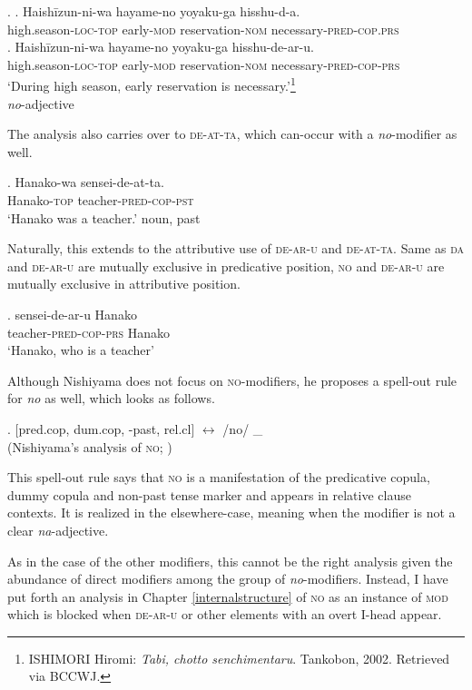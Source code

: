 \documentclass [output=book,colorlinks,citecolor=brown]{langscibook}
\begin{document}
\ex. \label{noadjective} \ag. Haishīzun-ni-wa hayame-no yoyaku-ga hisshu-d-a.\\
high.season-\textsc{loc-top} early-\textsc{mod} reservation-\textsc{nom} necessary-\textsc{pred-cop.prs}\\
\bg. Haishīzun-ni-wa hayame-no yoyaku-ga hisshu-de-ar-u.\\
high.season-\textsc{loc-top} early-\textsc{mod} reservation-\textsc{nom} necessary-\textsc{pred-cop-prs}\\
`During high season, early reservation is necessary.’\footnote{ISHIMORI Hiromi: \textit{Tabi, chotto senchimentaru}. Tankobon, 2002. Retrieved via BCCWJ.} \\ \null \hfill \textit{no}-adjective

The analysis also carries over to \textsc{de-at-ta}, which can-occur with a \textit{no}-modifier as well.

\exg. Hanako-wa sensei-de-at-ta.\\
Hanako-\textsc{top} teacher-\textsc{pred-cop-pst}\\
`Hanako was a teacher.' \null \hfill noun, past

Naturally, this extends to the attributive use of \textsc{de-ar-u} and \textsc{de-at-ta}. Same as \textsc{da} and \textsc{de-ar-u} are mutually exclusive in predicative position, \textsc{no} and \textsc{de-ar-u} are mutually exclusive in attributive position.


\exg. sensei-de-ar-u Hanako\\
teacher-\textsc{pred-cop-prs} Hanako\\
`Hanako, who is a teacher'

Although Nishiyama does not focus on \textsc{no}-modifiers, he proposes a spell-out rule for \textit{no} as well, which looks as follows.

\ex. [pred.cop, dum.cop, -past, rel.cl] $\leftrightarrow$ /no/ \_ \\ \null \hfill (Nishiyama’s analysis of \textsc{no}; \citealt[197]{nishiyama:1999:adj})

This spell-out rule says that \textsc{no} is a manifestation of the predicative copula, dummy copula and non-past tense marker and appears in relative clause contexts. It is realized in the elsewhere-case, meaning when the modifier is not a clear \textit{na}-adjective.

As in the case of the other modifiers, this cannot be the right analysis given the abundance of direct modifiers among the group of \textit{no}-modifiers. Instead, I have put forth an analysis in Chapter \ref{internalstructure} of \textsc{no} as an instance of \textsc{mod} which is blocked when \textsc{de-ar-u} or other elements with an overt I-head appear.
\end{document}
